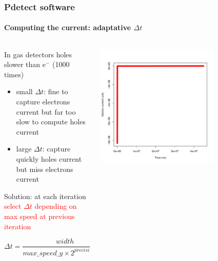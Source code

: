 \documentclass[14pt]{beamer}
\begin{document}

\begin{frame}
  \frametitle{Pdetect software}
  \framesubtitle{Computing the current: adaptative $\Delta t$}

  \begin{columns}
    \begin{column}{0.5\textwidth}

      \begin{center}
        
        \fontsize{10pt}{7.2}\selectfont
      In gas detectors holes slower than e$^-$ (1000 times)
      \begin{itemize}
        \item small $\Delta t$: fine to capture electrons current but far too slow
          to compute holes current
        \item large $\Delta t$: capture quickly holes current but miss electrons current
      \end{itemize}

      Solution: at each iteration \textcolor{red}{select $\Delta t$ depending on max speed at previous
      iteration}

      \[\Delta t = \frac{width}{max\_speed\_y \times 2^{precision\_level}}\]
      \end{center}
    \end{column}
    \begin{column}{0.5\textwidth}
       \includegraphics[width=0.7\textwidth]{images/helium2_unprecise.pdf}
       
       \vspace{-0.5cm}


\end{column}
\end{columns}
\end{frame}
\end{document}
